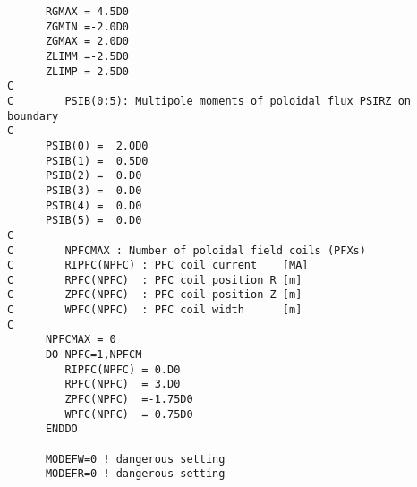 \documentclass[11pt]{article}
\begin{document}
{\begin{verbatim}
      RGMAX = 4.5D0
      ZGMIN =-2.0D0
      ZGMAX = 2.0D0
      ZLIMM =-2.5D0
      ZLIMP = 2.5D0
C
C        PSIB(0:5): Multipole moments of poloidal flux PSIRZ on boundary
C
      PSIB(0) =  2.0D0
      PSIB(1) =  0.5D0
      PSIB(2) =  0.D0
      PSIB(3) =  0.D0
      PSIB(4) =  0.D0
      PSIB(5) =  0.D0
C
C        NPFCMAX : Number of poloidal field coils (PFXs)
C        RIPFC(NPFC) : PFC coil current    [MA]
C        RPFC(NPFC)  : PFC coil position R [m]
C        ZPFC(NPFC)  : PFC coil position Z [m]
C        WPFC(NPFC)  : PFC coil width      [m]
C
      NPFCMAX = 0
      DO NPFC=1,NPFCM
         RIPFC(NPFC) = 0.D0
         RPFC(NPFC)  = 3.D0
         ZPFC(NPFC)  =-1.75D0
         WPFC(NPFC)  = 0.75D0
      ENDDO

      MODEFW=0 ! dangerous setting
      MODEFR=0 ! dangerous setting

\end{verbatim}
}
\end{document}
